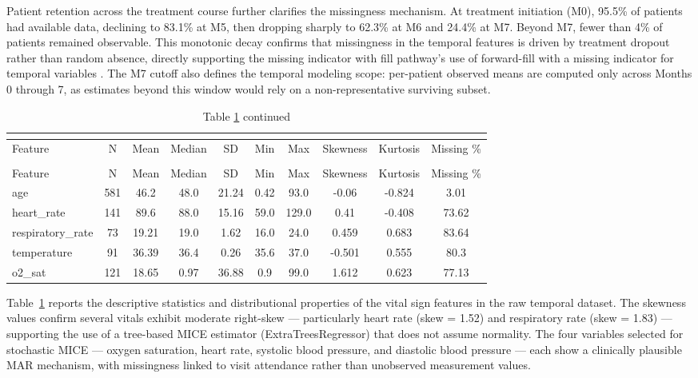 \documentclass[12pt]{article}
\begin{document}
Patient retention across the treatment course further clarifies the missingness mechanism. At treatment initiation (M0), 95.5\% of patients had available data, declining to 83.1\% at M5, then dropping sharply to 62.3\% at M6 and 24.4\% at M7. Beyond M7, fewer than 4\% of patients remained observable. This monotonic decay confirms that missingness in the temporal features is driven by treatment dropout rather than random absence, directly supporting the missing indicator with fill pathway's use of forward-fill with a missing indicator for temporal variables \citep{ref36}. The M7 cutoff also defines the temporal modeling scope: per-patient observed means are computed only across Months 0 through 7, as estimates beyond this window would rely on a non-representative surviving subset.

\begin{longtable}[l]{lccccccccc}
\caption{Descriptive Statistics and Skewness of Raw Vital Sign Features (Justifying Clinical Bound Clipping and MICE Imputation)} \\
\label{tab:vitals_descriptive_stats} \\
\toprule
Feature & N & Mean & Median & SD & Min & Max & Skewness & Kurtosis & Missing \% \\
\midrule
\endfirsthead
\caption*{Table \ref{tab:vitals_descriptive_stats} continued} \\
\toprule
Feature & N & Mean & Median & SD & Min & Max & Skewness & Kurtosis & Missing \% \\
\midrule
\endhead
\midrule
\endfoot
\bottomrule
\endlastfoot
\small
age & 581 & 46.2 & 48.0 & 21.24 & 0.42 & 93.0 & -0.06 & -0.824 & 3.01 \\
heart\_rate & 141 & 89.6 & 88.0 & 15.16 & 59.0 & 129.0 & 0.41 & -0.408 & 73.62 \\
respiratory\_rate & 73 & 19.21 & 19.0 & 1.62 & 16.0 & 24.0 & 0.459 & 0.683 & 83.64 \\
temperature & 91 & 36.39 & 36.4 & 0.26 & 35.6 & 37.0 & -0.501 & 0.555 & 80.3 \\
o2\_sat & 121 & 18.65 & 0.97 & 36.88 & 0.9 & 99.0 & 1.612 & 0.623 & 77.13 \\
\end{longtable}


Table~\ref{tab:vitals_descriptive_stats} reports the descriptive statistics and distributional properties of the vital sign features in the raw temporal dataset. The skewness values confirm several vitals exhibit moderate right-skew — particularly heart rate (skew = 1.52) and respiratory rate (skew = 1.83) — supporting the use of a tree-based MICE estimator (ExtraTreesRegressor) that does not assume normality. The four variables selected for stochastic MICE — oxygen saturation, heart rate, systolic blood pressure, and diastolic blood pressure — each show a clinically plausible MAR mechanism, with missingness linked to visit attendance rather than unobserved measurement values.
\end{document}

